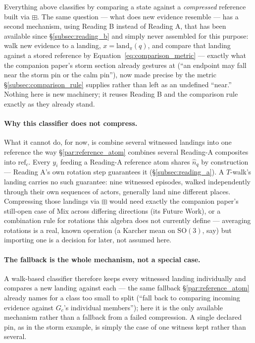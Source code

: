 \documentclass[12pt, a4paper]{article}
\begin{document}
Everything above classifies by comparing a state against a
\emph{compressed} reference built via $\boxplus$. The same question
--- what does new evidence resemble --- has a second mechanism,
using Reading B instead of Reading A, that has been available since
\S\ref{subsec:reading_b} and simply never assembled for this purpose:
walk new evidence to a landing, $x=\mathrm{land}_\pi(q)$, and compare
that landing against a stored reference by
Equation~\eqref{eq:comparison_metric} --- exactly what the companion
paper's storm section already gestures at (``an endpoint may fall
near the storm pin or the calm pin''), now made precise by the metric
\S\ref{subsec:comparison_rule} supplies rather than left as an
undefined ``near.'' Nothing here is new machinery; it reuses Reading
B and the comparison rule exactly as they already stand.

\paragraph{Why this classifier does not compress.}
What it cannot do, for now, is combine several witnessed landings
into one reference the way \S\ref{par:reference_atom} combines
several Reading-A composites into $\mathrm{ref}_c$. Every $y_i$
feeding a Reading-A reference atom shares $\hat n_q$ by construction
--- Reading A's own rotation step guarantees it
(\S\ref{subsec:reading_a}). A $T$-walk's landing carries no such
guarantee: nine witnessed episodes, walked independently through
their own sequences of actors, generally land nine different places.
Compressing those landings via $\boxplus$ would need exactly the
companion paper's still-open case of Mix across differing directions
(its Future Work), or a combination rule for rotations this algebra
does not currently define --- averaging rotations is a real, known
operation (a Karcher mean on $\mathrm{SO}(3)$, say) but importing one
is a decision for later, not assumed here.

\paragraph{The fallback is the whole mechanism, not a special case.}
A walk-based classifier therefore keeps every witnessed landing
individually and compares a new landing against each --- the same
fallback \S\ref{par:reference_atom} already names for a class too
small to split (``fall back to comparing incoming evidence against
$G_c$'s individual members''); here it is the only available
mechanism rather than a fallback from a failed compression. A single
declared pin, as in the storm example, is simply the case of one
witness kept rather than several.
\end{document}
